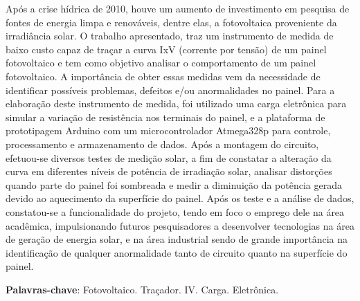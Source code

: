


\setlength{\absparsep}{18pt} %
\begin{resumo}
	
	Após a crise hídrica de 2010, houve um aumento de investimento em pesquisa de fontes de energia limpa e renováveis, dentre elas, a fotovoltaica proveniente da irradiância solar. O trabalho apresentado, traz um instrumento de medida de baixo custo capaz de traçar a curva IxV (corrente por tensão) de um painel fotovoltaico e tem como objetivo analisar o comportamento de um painel fotovoltaico. A importância de obter essas medidas vem da necessidade de identificar possíveis problemas, defeitos e/ou anormalidades no painel. Para a elaboração deste instrumento de medida, foi utilizado uma carga eletrônica para simular a variação de resistência nos terminais do painel, e a plataforma de prototipagem Arduino com um microcontrolador Atmega328p para controle, processamento e armazenamento de dados. Após a montagem do circuito, efetuou-se diversos testes de medição solar, a fim de constatar a alteração da curva em diferentes níveis de potência de irradiação solar, analisar distorções quando parte do painel foi sombreada e  medir a diminuição da potência gerada devido ao aquecimento da superfície do painel. Após os teste e a análise de dados, constatou-se a funcionalidade do projeto, tendo em foco o emprego dele na área acadêmica, impulsionando futuros pesquisadores a desenvolver tecnologias na área de geração de energia solar,  e na área industrial sendo de grande importância na identificação de qualquer anormalidade tanto de circuito quanto na superfície do painel.
	
	\vspace{\onelineskip}
	
	\textbf{Palavras-chave}: Fotovoltaico. Traçador. IV. Carga. Eletrônica.
\end{resumo}